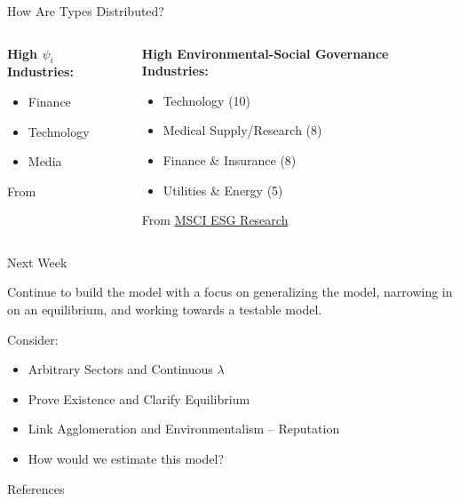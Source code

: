 \documentclass[11pt, dvipsnames, usenames]{beamer}
\begin{document}
\begin{frame}{How Are Types Distributed?}

\centering
\begin{columns}
\begin{column}{.4\textwidth}
\textbf{High $\psi_i$ Industries:}
\vspace{.5cm}

\begin{itemize}
\item Finance
\vspace{.25cm}

\item Technology
\vspace{.25cm}

\item Media
\end{itemize}
\vspace{.75cm}
From \cite{glaeser2008cities}

\end{column}
\begin{column}{.49\textwidth}
\textbf{High Environmental-Social Governance Industries:}
\vspace{.5cm}

\begin{itemize}
\item Technology (10)
\vspace{.25cm}

\item Medical Supply/Research (8)

\vspace{.25cm}
\item Finance \& Insurance (8)

\vspace{.25cm}
\item Utilities \& Energy (5)
\end{itemize}

\vspace{.5cm}
From \href{https://www.investors.com/research/best-esg-companies-top-stocks-environmental-social-governance-values/}{MSCI ESG Research}
\end{column}
\end{columns}

\end{frame}

\begin{frame}{Next Week}

Continue to build the model with a focus on generalizing the model, narrowing in on an equilibrium, and working towards a testable model.

\vfill
Consider:
\begin{itemize}
\item Arbitrary Sectors and Continuous $\lambda$
\item Prove Existence and Clarify Equilibrium
\item Link Agglomeration and Environmentalism -- Reputation
\item How would we estimate this model?
\end{itemize}

\end{frame}


\begin{frame}{References}
\nocite{*}

\end{frame}

%
\end{document}
